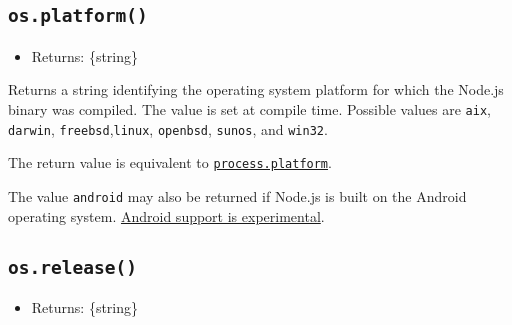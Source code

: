 \begin{Shaded}
\begin{Highlighting}[]
      \OperatorTok{:} \OperatorTok{,}
      \OperatorTok{:} \OperatorTok{,}
      \OperatorTok{:} \OperatorTok{,}
      \OperatorTok{:} \OperatorTok{,}
      \OperatorTok{:} 
\NormalTok{    \}}
\NormalTok{  ]}
\NormalTok{\}}
\end{Highlighting}
\end{Shaded}

\subsection{\texorpdfstring{\texttt{os.platform()}}{os.platform()}}\label{os.platform}

\begin{itemize}
\tightlist
\item
  Returns: \{string\}
\end{itemize}

Returns a string identifying the operating system platform for which the
Node.js binary was compiled. The value is set at compile time. Possible
values are \texttt{\textquotesingle{}aix\textquotesingle{}},
\texttt{\textquotesingle{}darwin\textquotesingle{}},
\texttt{\textquotesingle{}freebsd\textquotesingle{}},\texttt{\textquotesingle{}linux\textquotesingle{}},
\texttt{\textquotesingle{}openbsd\textquotesingle{}},
\texttt{\textquotesingle{}sunos\textquotesingle{}}, and
\texttt{\textquotesingle{}win32\textquotesingle{}}.

The return value is equivalent to
\href{process.md\#processplatform}{\texttt{process.platform}}.

The value \texttt{\textquotesingle{}android\textquotesingle{}} may also
be returned if Node.js is built on the Android operating system.
\href{https://github.com/nodejs/node/blob/HEAD/BUILDING.md\#androidandroid-based-devices-eg-firefox-os}{Android
support is experimental}.

\subsection{\texorpdfstring{\texttt{os.release()}}{os.release()}}\label{os.release}

\begin{itemize}
\tightlist
\item
  Returns: \{string\}
\end{itemize}

